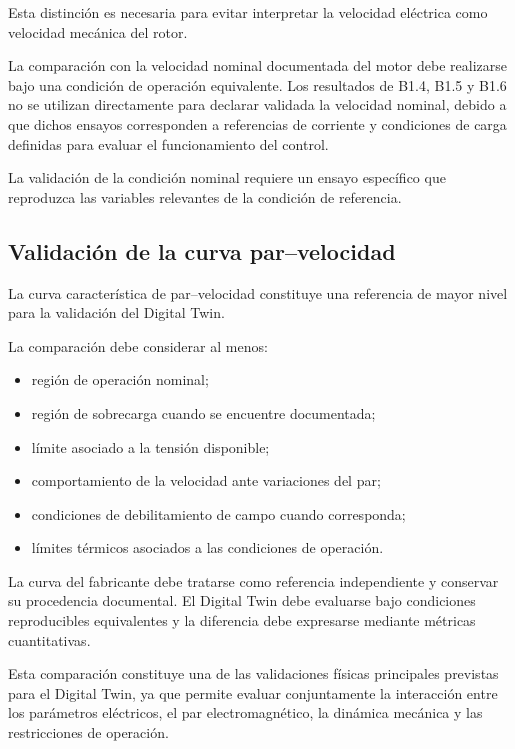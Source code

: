Esta distinción es necesaria para evitar interpretar la velocidad eléctrica como velocidad mecánica del rotor.

La comparación con la velocidad nominal documentada del motor debe realizarse bajo una condición de operación equivalente. Los resultados de B1.4, B1.5 y B1.6 no se utilizan directamente para declarar validada la velocidad nominal, debido a que dichos ensayos corresponden a referencias de corriente y condiciones de carga definidas para evaluar el funcionamiento del control.

La validación de la condición nominal requiere un ensayo específico que reproduzca las variables relevantes de la condición de referencia.

\subsection{Validación de la curva par--velocidad}

La curva característica de par--velocidad constituye una referencia de mayor nivel para la validación del Digital Twin.

La comparación debe considerar al menos:

\begin{itemize}

\item región de operación nominal;

\item región de sobrecarga cuando se encuentre documentada;

\item límite asociado a la tensión disponible;

\item comportamiento de la velocidad ante variaciones del par;

\item condiciones de debilitamiento de campo cuando corresponda;

\item límites térmicos asociados a las condiciones de operación.

\end{itemize}

La curva del fabricante debe tratarse como referencia independiente y conservar su procedencia documental. El Digital Twin debe evaluarse bajo condiciones reproducibles equivalentes y la diferencia debe expresarse mediante métricas cuantitativas.

Esta comparación constituye una de las validaciones físicas principales previstas para el Digital Twin, ya que permite evaluar conjuntamente la interacción entre los parámetros eléctricos, el par electromagnético, la dinámica mecánica y las restricciones de operación.

